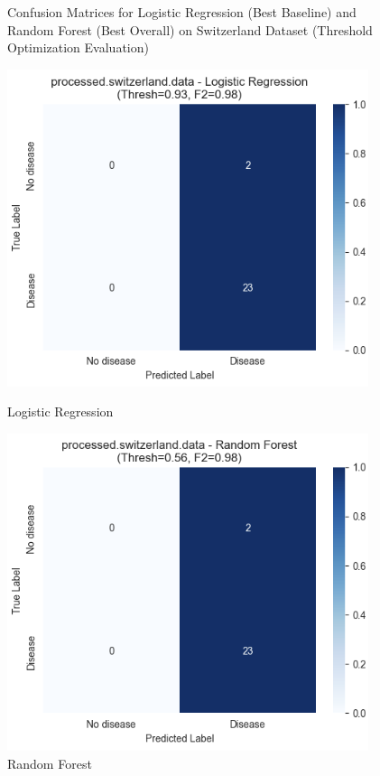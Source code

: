 \documentclass{article}
\begin{document}
\begin{figure}[htbp]
    \centering
    \caption{Confusion Matrices for Logistic Regression (Best Baseline) and Random Forest (Best Overall) on Switzerland Dataset (Threshold Optimization Evaluation)}
    \label{fig:confusion_matrices_switzerland_lr_rf}
    \begin{minipage}{0.48\textwidth}
        \centering
        \includegraphics[width=\textwidth]{plots/Switzerland_Logistic_Regression_CM.png} %
        \caption*{Logistic Regression}
    \end{minipage}\hfill
    \begin{minipage}{0.48\textwidth}
        \centering
        \includegraphics[width=\textwidth]{plots/Switzerland_Random_Forest_CM.png} %
        \caption*{Random Forest}
    \end{minipage}
\end{figure}
\end{document}
